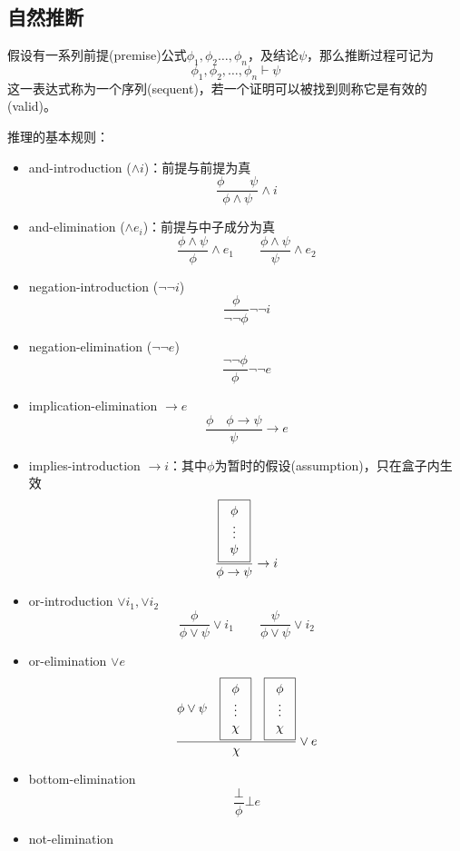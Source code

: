 \subsection{自然推断}
\begin{definition}
假设有一系列前提(premise)公式$\phi_1,\phi_2\ldots,\phi_n$，及结论$\psi$，那么推断过程可记为
\[\phi_1,\phi_2,\ldots,\phi_n\vdash\psi\]
这一表达式称为一个序列(sequent)，若一个证明可以被找到则称它是有效的(valid)。
\end{definition}

推理的基本规则：
\begin{itemize}
	\item and-introduction ($\land i$)：前提与前提为真
	\[\frac{\phi\qquad\psi}{\phi\land\psi}\land i\]
	\item and-elimination ($\land e_i$)：前提与中子成分为真
	\[\frac{\phi\land\psi}{\phi}\land e_1\qquad \frac{\phi\land\psi}{\psi}\land e_2\]
	\item negation-introduction ($\lnot\lnot i$)
	\[\frac{\phi}{\lnot\lnot\phi}\lnot\lnot i\]
	\item negation-elimination ($\lnot\lnot e$)
	\[\frac{\lnot\lnot\phi}{\phi}\lnot\lnot e\]
	\item implication-elimination $\to e$
	\[\frac{\phi\quad \phi\to\psi}{\psi}\to e\]
	\item implies-introduction $\to i$：其中$\phi$为暂时的假设(assumption)，只在盒子内生效
	\[\dfrac{\fbox{\begin{tabular}{c}$\phi$\\$\vdots$\\$\psi$\end{tabular}}}{\phi\to\psi}\to i\]
	\item or-introduction $\lor i_1,\lor i_2$
	\[\frac{\phi}{\phi\lor\psi}\lor i_1\qquad
	\frac{\psi}{\phi\lor\psi}\lor i_2\]
	\item or-elimination $\lor e$
	\[\frac{\phi\lor\psi\quad \fbox{\begin{tabular}{c}$\phi$\\$\vdots$\\$\chi$\end{tabular}}\quad \fbox{\begin{tabular}{c}$\phi$\\$\vdots$\\$\chi$\end{tabular}}}{\chi}\lor e\]
	\item bottom-elimination
	\[\frac{\bot}{\phi}\bot e\]
	\item not-elimination

\end{itemize}
